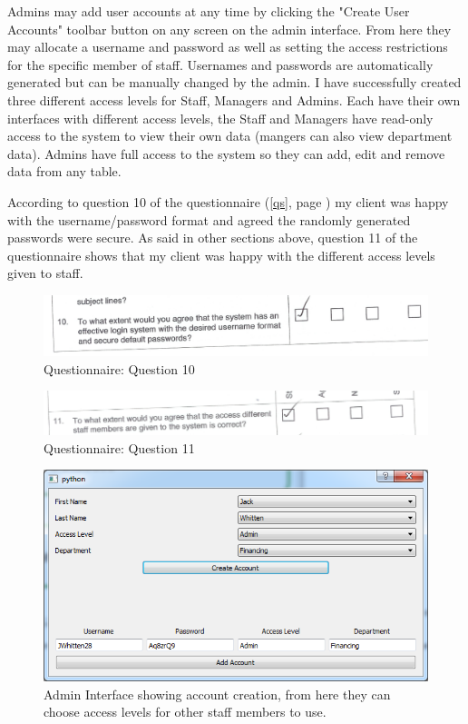 Admins may add user accounts at any time by clicking the "Create User Accounts" toolbar button on any screen on the admin interface. From here they may allocate a username and password as well as setting the access restrictions for the specific member of staff. Usernames and passwords are automatically generated but can be manually changed by the admin. I have successfully created three different access levels for Staff, Managers and Admins. Each have their own interfaces with different access levels, the Staff and Managers have read-only access to the system to view their own data (mangers can also view department data). Admins have full access to the system so they can add, edit and remove data from any table.

According to question 10 of the questionnaire (\ref{qs}, page \pageref{qs}) my client was happy with the username/password format and agreed the randomly generated passwords were secure. As said in other sections above, question 11 of the questionnaire shows that my client was happy with the different access levels given to staff.

\begin{figure}[H]
    \includegraphics[width=\textwidth]{./Evaluation/EvaluationQuestionnaire/10.png}
    \caption{Questionnaire: Question 10} 
\end{figure}

\begin{figure}[H]
    \includegraphics[width=\textwidth]{./Evaluation/EvaluationQuestionnaire/11.png}
    \caption{Questionnaire: Question 11} 
\end{figure}


\begin{figure}[H]
    \includegraphics[width=\textwidth]{./Evaluation/Images/login1.png}
    \caption{Admin Interface showing account creation, from here they can choose access levels for other staff members to use.} 
\end{figure}

